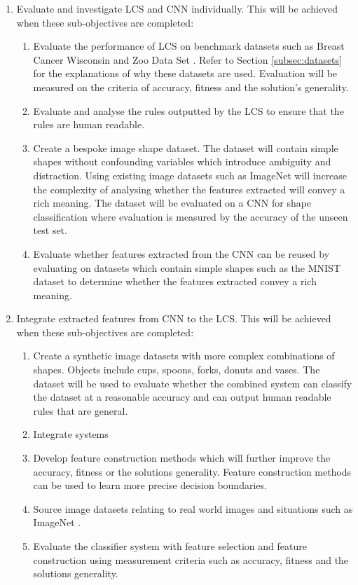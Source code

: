 \begin{enumerate}
	\item  Evaluate and investigate LCS and CNN individually. This will be achieved when these sub-objectives are completed:
	
	\begin{enumerate}
		\item Evaluate the performance of LCS on benchmark datasets such as Breast Cancer Wisconsin \cite{wisconsinbreast} and Zoo Data Set \cite{zoodata}. Refer to Section \ref{subsec:datasets} for the explanations of why these datasets are used. Evaluation will be measured on the criteria of accuracy, fitness and the solution's generality.
		\item Evaluate and analyse the rules outputted by the LCS to ensure that the rules are human readable.
		
		\item Create a bespoke image shape dataset. The dataset will contain simple shapes without confounding variables which introduce ambiguity and distraction. Using existing image datasets such as ImageNet \cite{imagenet} will increase the complexity of analysing whether the features extracted will convey a rich meaning. The dataset will be evaluated on a CNN for shape classification where evaluation is measured by the accuracy of the unseen test set.
		
		\item Evaluate whether features extracted from the CNN can be reused by evaluating on datasets which contain simple shapes such as the MNIST dataset to determine whether the features extracted convey a rich meaning.
		
	\end{enumerate}
	
	\item  Integrate extracted features from CNN to the LCS. This will be achieved when these sub-objectives are completed:
	
	\begin{enumerate}
		\item Create a synthetic image datasets with more complex combinations of shapes. Objects include cups, spoons, forks, donuts and vases. The dataset will be used to evaluate whether the combined system can classify the dataset at a reasonable accuracy and can output human readable rules that are general. 
		\item Integrate systems
		\item Develop feature construction methods which will further improve the accuracy, fitness or the solution\textquotesingle s generality. Feature construction methods can be used to learn more precise decision boundaries.
		
		\item Source image datasets relating to real world images and situations such as ImageNet \cite{imagenet}.
		
		\item Evaluate the classifier system with feature selection and feature construction using measurement criteria such as accuracy, fitness and the solution\textquotesingle s generality.
	\end{enumerate}
		
	
\end{enumerate}
